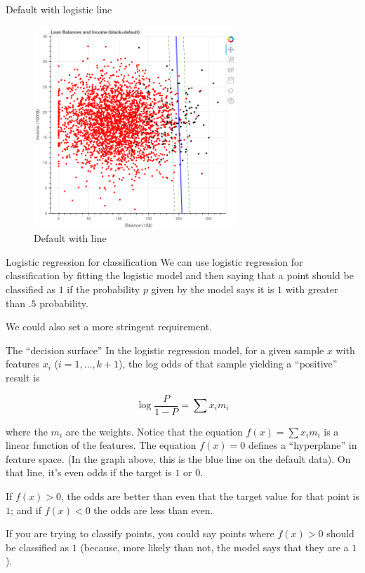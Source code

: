 \documentclass[
  ignorenonframetext,
]{beamer}
\begin{document}
\begin{frame}{Default with logistic line}
\protect\hypertarget{default-with-logistic-line}{}
\begin{figure}
\centering
\includegraphics[width=\textwidth,height=3in]{scatter_default_with_line.png}
\caption{Default with line}
\end{figure}
\end{frame}

\begin{frame}{Logistic regression for classification}
\protect\hypertarget{logistic-regression-for-classification}{}
We can use logistic regression for classification by fitting the
logistic model and then saying that a point should be classified as
\(1\) if the probability \(p\) given by the model says it is \(1\) with
greater than \(.5\) probability.

We could also set a more stringent requirement.
\end{frame}

\begin{frame}{The ``decision surface''}
\protect\hypertarget{the-decision-surface}{}
In the logistic regression model, for a given sample \(x\) with features
\(x_{i}\) (\(i=1,\ldots, k+1\)), the log odds of that sample yielding a
``positive'' result is

\[
\log\frac{P}{1-P} = \sum x_{i}m_{i}
\]

where the \(m_{i}\) are the weights. Notice that the equation
\(f(x)=\sum x_{i}m_{i}\) is a linear function of the features. The
equation \(f(x)=0\) defines a ``hyperplane'' in feature space. (In the
graph above, this is the blue line on the default data). On that line,
it's even odds if the target is \(1\) or \(0\).

If \(f(x)>0\), the odds are better than even that the target value for
that point is \(1\); and if \(f(x)<0\) the odds are less than even.

If you are trying to classify points, you could say points where
\(f(x)>0\) should be classified as \(1\) (because, more likely than not,
the model says that they are a \(1\)).
\end{frame}
\end{document}
